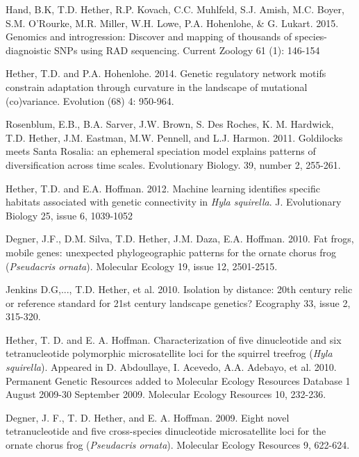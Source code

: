 \documentclass[letterpaper]{article}
\renewenvironment{itemize}{
  \begin{list}{}{
    \setlength{\leftmargin}{1.5em}
  }
}{
  \end{list}
}
\begin{document}
\begin{itemize}
\item Hand, B.K, T.D. Hether, R.P. Kovach, C.C. Muhlfeld, S.J. Amish, M.C. Boyer, S.M. O'Rourke, M.R. Miller, W.H. Lowe, P.A. Hohenlohe, \& G. Lukart. 2015. Genomics and introgression: Discover and mapping of thousands of species-diagnoistic SNPs using RAD sequencing.  Current Zoology 61 (1): 146-154

\item Hether, T.D. and P.A. Hohenlohe. 2014. Genetic regulatory network motifs constrain adaptation through curvature in the landscape of mutational (co)variance. Evolution (68) 4: 950-964.

\item Rosenblum, E.B., B.A. Sarver, J.W. Brown, S. Des Roches, K. M. Hardwick, T.D. Hether, J.M. Eastman, M.W. Pennell, and L.J. Harmon. 2011. Goldilocks meets Santa Rosalia: an ephemeral speciation model explains patterns of diversification across time scales. Evolutionary Biology. 39, number 2, 255-261.

\item Hether, T.D. and E.A. Hoffman. 2012. Machine learning identifies specific habitats associated with genetic connectivity in \emph{Hyla squirella}. J. Evolutionary Biology 25, issue 6, 1039-1052 

\item Degner, J.F., D.M. Silva, T.D. Hether, J.M. Daza, E.A. Hoffman. 2010. Fat frogs, mobile genes: unexpected phylogeographic patterns for the ornate chorus frog (\emph{Pseudacris ornata}). Molecular Ecology 19, issue 12, 2501-2515.

\item Jenkins D.G,..., T.D. Hether, et al. 2010. Isolation by distance: 20th century relic or reference standard for 21st century landscape genetics?  Ecography 33, issue 2, 315-320.

\item Hether, T. D. and E. A. Hoffman. Characterization of five dinucleotide and six tetranucleotide polymorphic microsatellite loci for the squirrel treefrog (\emph{Hyla squirella}).  Appeared in D. Abdoullaye, I. Acevedo, A.A. Adebayo, et al. 2010. Permanent Genetic Resources added to Molecular Ecology Resources Database 1 August 2009-30 September 2009. Molecular Ecology Resources 10, 232-236.

\item Degner, J. F., T. D. Hether, and E. A. Hoffman. 2009. Eight novel tetranucleotide and five cross-species dinucleotide microsatellite loci for the ornate chorus frog (\emph{Pseudacris ornata}). Molecular Ecology Resources 9, 622-624.


\end{itemize}
\end{document}
